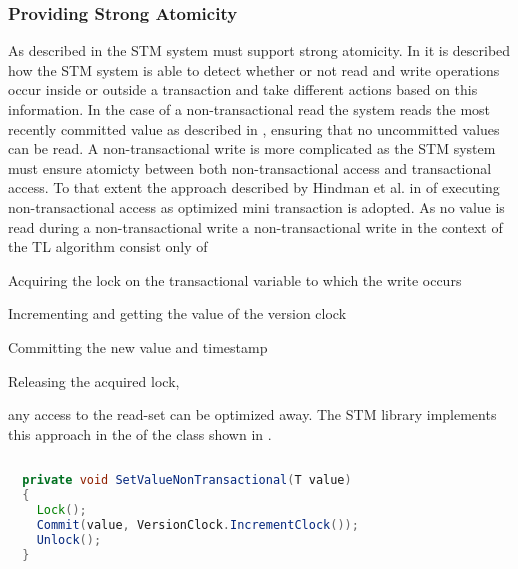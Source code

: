 \subsubsection{Providing Strong Atomicity}
\label{sec:stm_impl_providing_strong_atomicity}
As described in  the \ac{STM} system must support strong atomicity. In  it is described how the \ac{STM} system is able to detect whether or not read and write operations occur inside or outside a transaction and take different actions based on this information. In the case of a non-transactional read the system reads the most recently committed value as described in , ensuring that no uncommitted values can be read. A non-transactional write is more complicated as the \ac{STM} system must ensure atomicty between both non-transactional access and transactional access. To that extent the approach described by Hindman et al. in \cite{hindman2006atomicity} of executing non-transactional access as optimized mini transaction is adopted. As no value is read during a non-transactional write a non-transactional write in the context of the TL algorithm consist only of 
\begin{inparaenum}[(1)]
\item Acquiring the lock on the transactional variable to which the write occurs
\item Incrementing and getting the value of the version clock
\item Committing the new value and timestamp
\item Releasing the acquired lock,
\end{inparaenum}
any access to the read-set can be optimized away. The \ac{STM} library implements this approach in the  of the  class shown in .
\begin{lstlisting}[label=lst:library_non_trans_write,
  caption={Non-transactional Write},
  language=Java,  
  showspaces=false,
  showtabs=false,
  breaklines=true,
  showstringspaces=false,
  breakatwhitespace=true,
  commentstyle=\color{greencomments},
  keywordstyle=\color{bluekeywords},
  stringstyle=\color{redstrings},
  morekeywords={atomic, retry, orElse, var, get, set}]  % Start your code-block
  
  private void SetValueNonTransactional(T value)
  {
    Lock();
    Commit(value, VersionClock.IncrementClock());
    Unlock();
  }
\end{lstlisting}


